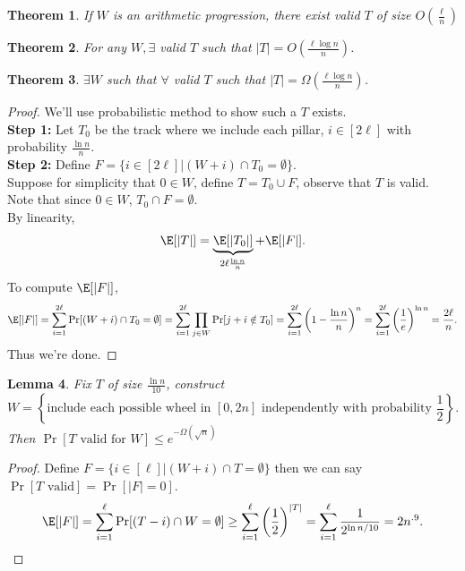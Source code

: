 \documentclass[a4paper]{article}
\newtheorem{thm}{Theorem}[section]
\newtheorem{lem}[thm]{Lemma}
\begin{document}
\begin{thm}
    If $W$ is an arithmetic progression, there exist valid $T$ of size $O \left( \frac{\ell}{n} \right)$
\end{thm}
\begin{thm}
    For any $W, \exists$ valid $T$ such that $|T|= O \left( \frac{\ell \log n}{n} \right)$. 
\end{thm}
\begin{thm}
    $\exists W$ such that $\forall$ valid $T$ such that $|T|=\Omega \left( \frac{\ell \log n}{n} \right)$.
\end{thm}
\begin{proof}We'll use probabilistic method to show such a $T$ exists. \\
    \textbf{Step 1:} Let $T_0$ be the track where we include each pillar, $i\in [2\ell]$ with probability $\frac{\ln n}{n}$. \\
    \textbf{Step 2:} Define $F= \{i\in [2\ell] | (W+i)\cap T_0=\emptyset\}$. \\
    Suppose for simplicity that $0\in W$, define $T=T_0\cup F$, observe that $T$ is valid. Note that since $0\in W$, $T_0\cap F=\emptyset$. 
    \\
    By linearity, 
    \[
    \E[|T|]=\underbrace{\E[|T_0|]}_{2\ell \frac{\ln n}{n}}+\E[|F|]
    .\] 
    To compute $\E[|F|]$, 
    \[
    \E[|F|]=\sum_{i=1}^{2\ell} \Pr[(W+i)\cap T_0=\emptyset]=\sum_{i=1}^{2\ell}\prod_{j\in W}\Pr[j+i\notin T_0]=\sum_{i=1}^{2\ell} \left( 1- \frac{\ln n}{n} \right)^{n}=\sum_{i=1}^{2\ell} \left( \frac{1}{e} \right)^{\ln n}=\frac{2\ell}{n}
    .\] 
    Thus we're done. 
\end{proof}
\begin{lem}
    Fix $T$ of size $\frac{\ln n}{10}$, construct \[
        W = \left \{\text{include each possible wheel in $[0,2n]$ independently with probability $\frac{1}{2}$}\right \}
    .\] 
    Then $\Pr[T \text{ valid for } W]\leq e^{-\Omega(\sqrt{n})}$
\end{lem}
\begin{proof}
    Define $F= \{i\in [\ell]|(W+i)\cap T=\emptyset\}$ then we can say $\Pr[T \text{ valid}]=\Pr[|F|=0]$.
    \[
    \E[|F|]=\sum_{i=1}^\ell \Pr[(T-i)\cap W=\emptyset]\geq \sum_{i=1}^\ell \left( \frac{1}{2} \right)^{|T|}=\sum_{i=1}^\ell \frac{1}{2^{\ln n/10}}=2n^{.9}
    .\] 
\end{proof}
\end{document}
